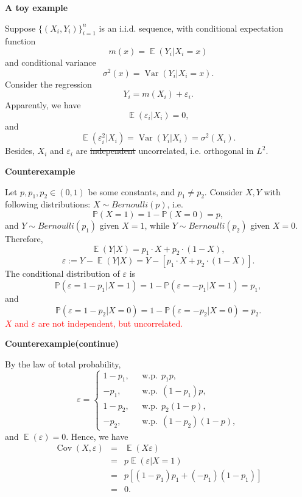 \documentclass[19pt,landscaoe]{article}
\newcommand{\IP}{\mathbb{P}}
\DeclareMathOperator{\E}{\mathbb{E}}
\DeclareMathOperator{\Var}{\mathrm{Var}}
\DeclareMathOperator{\cov}{\mathrm{Cov}}
\begin{document}
\newpage
{\LARGE\centerline{\textbf{A toy example}}}
\vskip25pt
\begin{minipage}{.9\textwidth}
    \Large 
Suppose $\big\{(X_i,Y_i)\big\}_{i=1}^n$ is an i.i.d. sequence, with conditional expectation function
$$m(x)=\E(Y_i|X_i=x)$$ 
and conditional variance $$\sigma^2(x)=\Var(Y_i|X_i=x).$$
Consider the regression 
\begin{equation}\label{L1-eq1}
    Y_i=m(X_i)+\varepsilon_i.
\end{equation}
Apparently, we have 
$$\E(\varepsilon_i|X_i)=0,$$ and
$$\E(\varepsilon_i^2|X_i)=\Var(Y_i|X_i)=\sigma^2(X_i).$$
Besides, $X_i$ and $\varepsilon_i$ are \sout{independent} uncorrelated, i.e. orthogonal in $L^2$.
\end{minipage}

\newpage
{\LARGE\centerline{\textbf{Counterexample}}}
\vskip25pt
\begin{minipage}{.9\textwidth}
    \Large 
    Let $p,p_1,p_2\in(0,1)$ be some constants, and $p_1\ne p_2$. Consider $X,Y$ with following distributions: 
$X\sim Bernoulli(p)$, i.e. 
$$\IP(X=1)=1-\IP(X=0)=p,$$
and $Y\sim Bernoulli(p_1)$ given $X=1$, while $Y\sim Bernoulli(p_2)$ given $X=0$. Therefore, 
$$\E(Y|X)=p_1\cdot X+p_2\cdot(1-X),$$
$$\varepsilon:=Y-\E(Y|X)=Y-[p_1\cdot X+p_2\cdot(1-X)].$$
The conditional distribution of $\varepsilon$ is
$$\IP(\varepsilon=1-p_1|X=1)=1-\IP(\varepsilon=-p_1|X=1)=p_1,$$
and  
$$\IP(\varepsilon=1-p_2|X=0)=1-\IP(\varepsilon=-p_2|X=0)=p_2.$$
\textcolor{red}{$X$ and $\varepsilon$ are not independent, but uncorrelated.}
\end{minipage}

\newpage
{\LARGE\centerline{\textbf{Counterexample(continue)}}}
\vskip25pt
\begin{minipage}{.9\textwidth}
    \Large 
    By the law of total probability, 
    \begin{equation*}
        \varepsilon=\begin{cases}
            1-p_1,~~~&\mathrm{w.p.}~~p_1p,\\
            -p_1,~~~&\mathrm{w.p.}~~(1-p_1)p,\\
            1-p_2,~~~&\mathrm{w.p.}~~p_2(1-p),\\
            -p_2,~~~&\mathrm{w.p.}~~(1-p_2)(1-p),
        \end{cases}
    \end{equation*}
 and  $\E(\varepsilon)=0$. Hence, we have 
   \begin{eqnarray*}
    \cov(X,\varepsilon)&=&\E(X\varepsilon)\\
    &=&p\E(\varepsilon|X=1)\\
    &=&p[(1-p_1)p_1+(-p_1)(1-p_1)]\\
    &=&0.
   \end{eqnarray*}
\end{minipage}









\newpage


\end{document}
